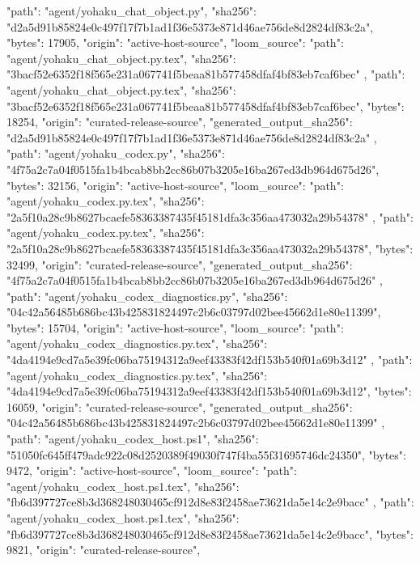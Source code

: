 {    {
      "path": "agent/yohaku_chat_object.py",
      "sha256": "d2a5d91b85824e0c497f17f7b1ad1f36e5373e871d46ae756de8d2824df83c2a",
      "bytes": 17905,
      "origin": "active-host-source",
      "loom_source": {
        "path": "agent/yohaku_chat_object.py.tex",
        "sha256": "3bacf52e6352f18f565e231a067741f5beaa81b577458dfaf4bf83eb7caf6bec"
      }
    },
    {
      "path": "agent/yohaku_chat_object.py.tex",
      "sha256": "3bacf52e6352f18f565e231a067741f5beaa81b577458dfaf4bf83eb7caf6bec",
      "bytes": 18254,
      "origin": "curated-release-source",
      "generated_output_sha256": "d2a5d91b85824e0c497f17f7b1ad1f36e5373e871d46ae756de8d2824df83c2a"
    },
    {
      "path": "agent/yohaku_codex.py",
      "sha256": "4f75a2c7a04f0515fa1b4bcab8bb2cc86b07b3205e16ba267ed3db964d675d26",
      "bytes": 32156,
      "origin": "active-host-source",
      "loom_source": {
        "path": "agent/yohaku_codex.py.tex",
        "sha256": "2a5f10a28c9b8627bcaefe58363387435f45181dfa3c356aa473032a29b54378"
      }
    },
    {
      "path": "agent/yohaku_codex.py.tex",
      "sha256": "2a5f10a28c9b8627bcaefe58363387435f45181dfa3c356aa473032a29b54378",
      "bytes": 32499,
      "origin": "curated-release-source",
      "generated_output_sha256": "4f75a2c7a04f0515fa1b4bcab8bb2cc86b07b3205e16ba267ed3db964d675d26"
    },
    {
      "path": "agent/yohaku_codex_diagnostics.py",
      "sha256": "04c42a56485b686bc43b425831824497c2b6c03797d02bee45662d1e80e11399",
      "bytes": 15704,
      "origin": "active-host-source",
      "loom_source": {
        "path": "agent/yohaku_codex_diagnostics.py.tex",
        "sha256": "4da4194e9cd7a5e39fc06ba75194312a9eef43383f42df153b540f01a69b3d12"
      }
    },
    {
      "path": "agent/yohaku_codex_diagnostics.py.tex",
      "sha256": "4da4194e9cd7a5e39fc06ba75194312a9eef43383f42df153b540f01a69b3d12",
      "bytes": 16059,
      "origin": "curated-release-source",
      "generated_output_sha256": "04c42a56485b686bc43b425831824497c2b6c03797d02bee45662d1e80e11399"
    },
    {
      "path": "agent/yohaku_codex_host.ps1",
      "sha256": "51050fc645ff479adc922c08d2520389f49030f747f4ba55f31695746dc24350",
      "bytes": 9472,
      "origin": "active-host-source",
      "loom_source": {
        "path": "agent/yohaku_codex_host.ps1.tex",
        "sha256": "fb6d397727ce8b3d368248030465cf912d8e83f2458ae73621da5e14c2e9bacc"
      }
    },
    {
      "path": "agent/yohaku_codex_host.ps1.tex",
      "sha256": "fb6d397727ce8b3d368248030465cf912d8e83f2458ae73621da5e14c2e9bacc",
      "bytes": 9821,
      "origin": "curated-release-source",
}}
